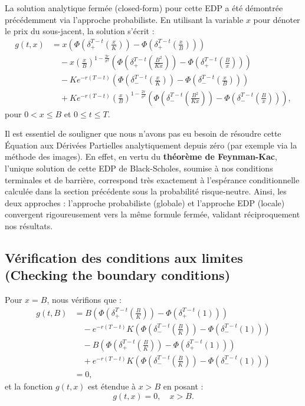 \documentclass[11pt]{article}
\begin{document}
La solution analytique fermée (closed-form) pour cette EDP a été démontrée précédemment via l'approche probabiliste. En utilisant la variable $x$ pour dénoter le prix du sous-jacent, la solution s'écrit :
\begin{align}
g(t, x) &= x \left( \Phi\left(\delta_{+}^{T-t}\left(\frac{x}{K}\right)\right) - \Phi\left(\delta_{+}^{T-t}\left(\frac{x}{B}\right)\right) \right) \nonumber \\
&\quad - x \left(\frac{x}{B}\right)^{1 - \frac{2r}{\sigma^2}} \left( \Phi\left(\delta_{+}^{T-t}\left(\frac{B^2}{Kx}\right)\right) - \Phi\left(\delta_{+}^{T-t}\left(\frac{B}{x}\right)\right) \right) \nonumber \\
&\quad - K e^{-r(T-t)} \left( \Phi\left(\delta_{-}^{T-t}\left(\frac{x}{K}\right)\right) - \Phi\left(\delta_{-}^{T-t}\left(\frac{x}{B}\right)\right) \right) \nonumber \\
&\quad + K e^{-r(T-t)} \left(\frac{x}{B}\right)^{1 - \frac{2r}{\sigma^2}} \left( \Phi\left(\delta_{-}^{T-t}\left(\frac{B^2}{Kx}\right)\right) - \Phi\left(\delta_{-}^{T-t}\left(\frac{B}{x}\right)\right) \right),
\end{align}
pour $0 < x \le B$ et $0 \le t \le T$.

Il est essentiel de souligner que nous n'avons pas eu besoin de résoudre cette Équation aux Dérivées Partielles analytiquement depuis zéro (par exemple via la méthode des images). En effet, en vertu du \textbf{théorème de Feynman-Kac}, l'unique solution de cette EDP de Black-Scholes, soumise à nos conditions terminales et de barrière, correspond très exactement à l'espérance conditionnelle calculée dans la section précédente sous la probabilité risque-neutre. Ainsi, les deux approches : l'approche probabiliste (globale) et l'approche EDP (locale) convergent rigoureusement vers la même formule fermée, validant réciproquement nos résultats.

\subsection*{Vérification des conditions aux limites (Checking the boundary conditions)}

Pour $x = B$, nous vérifions que :
\begin{align*}
g(t, B) &= B \left( \Phi\left(\delta_{+}^{T-t}\left(\frac{B}{K}\right)\right) - \Phi\left(\delta_{+}^{T-t}(1)\right) \right) \\
&\quad - e^{-r(T-t)} K \left( \Phi\left(\delta_{-}^{T-t}\left(\frac{B}{K}\right)\right) - \Phi\left(\delta_{-}^{T-t}(1)\right) \right) \\
&\quad - B \left( \Phi\left(\delta_{+}^{T-t}\left(\frac{B}{K}\right)\right) - \Phi\left(\delta_{+}^{T-t}(1)\right) \right) \\
&\quad + e^{-r(T-t)} K \left( \Phi\left(\delta_{-}^{T-t}\left(\frac{B}{K}\right)\right) - \Phi\left(\delta_{-}^{T-t}(1)\right) \right) \\
&= 0,
\end{align*}
et la fonction $g(t, x)$ est étendue à $x > B$ en posant :
\begin{equation*}
g(t, x) = 0, \quad x > B.
\end{equation*}
\end{document}
